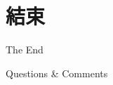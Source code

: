 \documentclass[12pt,aspectratio=43]{beamer}
\begin{document}
\section*{結束}

\begin{frame}[plain] %
	\begin{center}
		{\Huge The End}
		\bigskip\bigskip 

		{\LARGE Questions  \&  Comments}
	\end{center}
\end{frame}
\end{document}
